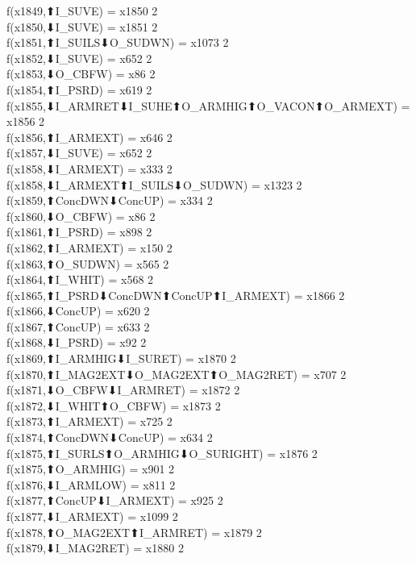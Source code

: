 f(x1849,⬆I_SUVE) = x1850 {2} \\
f(x1850,⬇I_SUVE) = x1851 {2} \\
f(x1851,⬆I_SUILS⬇O_SUDWN) = x1073 {2} \\
f(x1852,⬇I_SUVE) = x652 {2} \\
f(x1853,⬇O_CBFW) = x86 {2} \\
f(x1854,⬆I_PSRD) = x619 {2} \\
f(x1855,⬇I_ARMRET⬇I_SUHE⬆O_ARMHIG⬆O_VACON⬆O_ARMEXT) = x1856 {2} \\
f(x1856,⬆I_ARMEXT) = x646 {2} \\
f(x1857,⬇I_SUVE) = x652 {2} \\
f(x1858,⬇I_ARMEXT) = x333 {2} \\
f(x1858,⬇I_ARMEXT⬆I_SUILS⬇O_SUDWN) = x1323 {2} \\
f(x1859,⬆ConcDWN⬇ConcUP) = x334 {2} \\
f(x1860,⬇O_CBFW) = x86 {2} \\
f(x1861,⬆I_PSRD) = x898 {2} \\
f(x1862,⬆I_ARMEXT) = x150 {2} \\
f(x1863,⬆O_SUDWN) = x565 {2} \\
f(x1864,⬆I_WHIT) = x568 {2} \\
f(x1865,⬆I_PSRD⬇ConcDWN⬆ConcUP⬆I_ARMEXT) = x1866 {2} \\
f(x1866,⬇ConcUP) = x620 {2} \\
f(x1867,⬆ConcUP) = x633 {2} \\
f(x1868,⬇I_PSRD) = x92 {2} \\
f(x1869,⬆I_ARMHIG⬇I_SURET) = x1870 {2} \\
f(x1870,⬆I_MAG2EXT⬇O_MAG2EXT⬆O_MAG2RET) = x707 {2} \\
f(x1871,⬇O_CBFW⬇I_ARMRET) = x1872 {2} \\
f(x1872,⬇I_WHIT⬆O_CBFW) = x1873 {2} \\
f(x1873,⬆I_ARMEXT) = x725 {2} \\
f(x1874,⬆ConcDWN⬇ConcUP) = x634 {2} \\
f(x1875,⬆I_SURLS⬆O_ARMHIG⬇O_SURIGHT) = x1876 {2} \\
f(x1875,⬆O_ARMHIG) = x901 {2} \\
f(x1876,⬇I_ARMLOW) = x811 {2} \\
f(x1877,⬆ConcUP⬇I_ARMEXT) = x925 {2} \\
f(x1877,⬇I_ARMEXT) = x1099 {2} \\
f(x1878,⬆O_MAG2EXT⬆I_ARMRET) = x1879 {2} \\
f(x1879,⬇I_MAG2RET) = x1880 {2} \\

